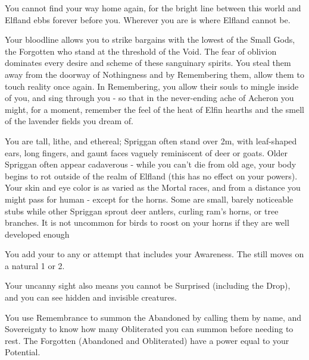 {  You cannot find your way home again, for the bright line between this world and Elfland ebbs forever before you.  Wherever you are is where Elfland cannot be.

  Your bloodline allows you to strike bargains with the lowest of the Small Gods, the Forgotten who stand at the threshold of the Void.  The fear of oblivion dominates every desire and scheme of these sanguinary spirits.  You steal them away from the doorway of Nothingness and by Remembering them, allow them to touch reality once again.  In Remembering, you allow their souls to mingle inside of you, and sing through you - so that in the never-ending ache of Acheron you might, for a moment, remember the feel of the heat of Elfin hearths and the smell of the lavender fields you dream of.  

  You are tall, lithe, and ethereal; Spriggan often stand over 2m, with leaf-shaped ears, long fingers, and gaunt faces vaguely reminiscent of deer or goats.  Older Spriggan often appear cadaverous - while you can't die from old age, your body begins to rot outside of the realm of Elfland (this has no effect on your powers).  Your skin and eye color is as varied as the Mortal races, and from a distance you might pass for human - except for the horns.  Some are small, barely noticeable stubs while other Spriggan sprout deer antlers, curling ram's horns, or tree branches.  It is not uncommon for birds to roost on your horns if they are well developed enough 


  




  You add your \LVL to any \RO or \RB attempt that includes your Awareness.  The \UD still moves \DCDOWN on a natural 1 or 2.

  Your uncanny sight also means you cannot be Surprised (including the Drop), and you can see hidden and invisible creatures.


   You use Remembrance to summon the Abandoned by calling them by name, and Sovereignty to know how many Obliterated you can summon before needing to rest.  The Forgotten (Abandoned and Obliterated) have a power equal to your Potential.

}
